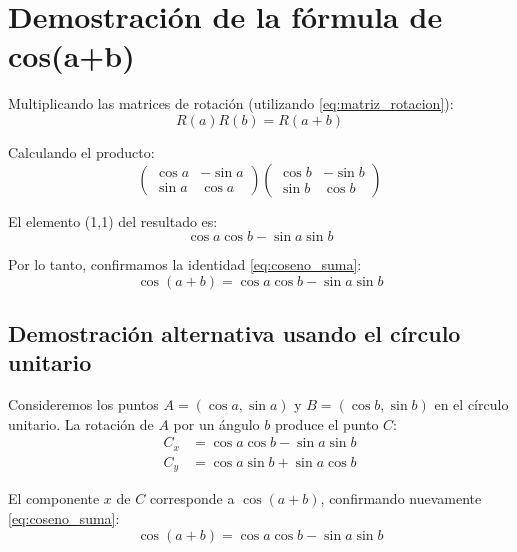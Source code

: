 \section{Demostración de la fórmula de cos(a+b)}\label{sec:demcos}
Multiplicando las matrices de rotación (utilizando \eqref{eq:matriz_rotacion}):
\begin{equation}\label{eq:producto_matrices}
R(a) R(b) = R(a + b)
\end{equation}

Calculando el producto:
\begin{equation*}
\begin{pmatrix}
\cos a & -\sin a \\
\sin a & \cos a
\end{pmatrix}
\begin{pmatrix}
\cos b & -\sin b \\
\sin b & \cos b
\end{pmatrix}
\end{equation*}

El elemento (1,1) del resultado es:
\begin{equation*}
\cos a \cos b - \sin a \sin b
\end{equation*}

Por lo tanto, confirmamos la identidad \eqref{eq:coseno_suma}:
\begin{equation}\label{eq:coseno_suma_confirmado}
\cos(a + b) = \cos a \cos b - \sin a \sin b
\end{equation}

\subsection*{Demostración alternativa usando el círculo unitario}
Consideremos los puntos $A = (\cos a, \sin a)$ y $B = (\cos b, \sin b)$ en el círculo unitario. La rotación de $A$ por un ángulo $b$ produce el punto $C$:
\begin{align*}
C_x &= \cos a \cos b - \sin a \sin b \\
C_y &= \cos a \sin b + \sin a \cos b
\end{align*}

El componente $x$ de $C$ corresponde a $\cos(a+b)$, confirmando nuevamente \eqref{eq:coseno_suma}:
\begin{equation}\label{eq:coseno_suma_circulo}
\cos(a+b) = \cos a \cos b - \sin a \sin b
\end{equation}

